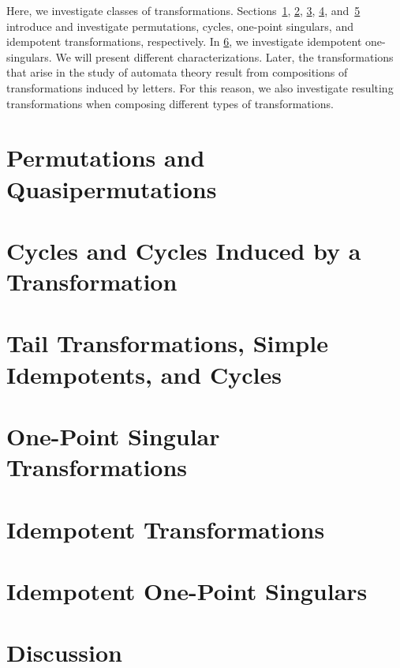 
Here, we investigate classes of transformations.
Sections~\ref{prelim:sec:perm}, \ref{prelim:sec:cycles}, \ref{subsec:tail}, \ref{prelim:sec:oneattractor}, and~\ref{prelim:sec:idempotent}
introduce and investigate permutations, cycles, one-point singulars, and idempotent transformations, respectively.
In \cref{prelim:sec:idempotentoneattractor},
we investigate idempotent one-singulars.
We will present different characterizations.
Later, the transformations that arise  in the study of automata theory
result from compositions of transformations induced by letters.
For this reason, we also investigate
resulting transformations when composing different types of transformations.

\section{Permutations and Quasipermutations} 
\label{prelim:sec:perm} 



\section{Cycles and Cycles Induced by a Transformation} 
\label{prelim:sec:cycles}



\section{Tail Transformations, Simple Idempotents, and Cycles}
\label{subsec:tail}



\section{One-Point Singular Transformations}
\label{prelim:sec:oneattractor} 



\section{Idempotent Transformations}
\label{prelim:sec:idempotent} 



\section{Idempotent One-Point Singulars}
\label{prelim:sec:idempotentoneattractor} 



\section{Discussion}

